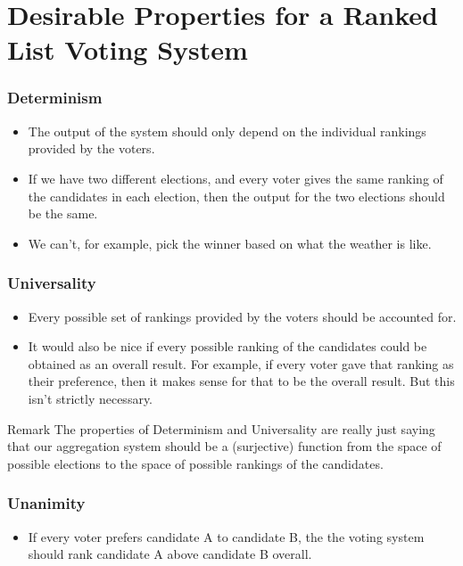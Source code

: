 \documentclass{beamer}
\begin{document}
    \section{Desirable Properties for a Ranked List Voting System}
    \begin{frame}
        \frametitle{Determinism}

        \begin{itemize}
            \item The output of the system should only depend on the individual rankings provided by the voters.\pause
            \item If we have two different elections, and every voter gives the same ranking of the candidates in each election, then the output for the two elections should be the same. \pause
            \item We can't, for example, pick the winner based on what the weather is like.
        \end{itemize}

    \end{frame}
    \begin{frame}
        \frametitle{Universality}
    
        \begin{itemize}
            \item Every possible set of rankings provided by the voters should be accounted for.\pause

            \item It would also be nice if every possible ranking of the candidates could be obtained as an overall result. For example, if every voter gave that ranking as their preference, then it makes sense for that to be the overall result. But this isn't strictly necessary.\pause
        \end{itemize}

        \begin{block}{Remark}
            The properties of \alert{Determinism} and \alert{Universality} are really just saying that our aggregation system should be a (surjective) function from the space of possible elections to the space of possible rankings of the candidates.
        \end{block}
    
    \end{frame}
    \begin{frame}
        \frametitle{Unanimity}
    
        \begin{itemize}
            \item If \alert{every} voter prefers candidate A to candidate B, the the voting system should rank candidate A above candidate B overall.
        \end{itemize}

    \end{frame}
\end{document}
